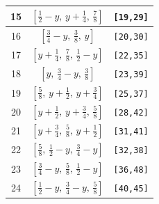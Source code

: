 \documentclass[fleqn,8pt]{jsarticle}
\begin{document}
\begin{longtable}{ccc}
15 & $\left[ \frac{1}{2} - y,\, y + \frac{1}{4},\, \frac{7}{8} \right]$ & {\tt [19,29]} \\ \hline
16 & $\left[ \frac{3}{4} - y,\, \frac{3}{8},\, y \right]$ & {\tt [20,30]} \\ \hline
17 & $\left[ y + \frac{1}{4},\, \frac{7}{8},\, \frac{1}{2} - y \right]$ & {\tt [22,35]} \\ \hline
18 & $\left[ y,\, \frac{3}{4} - y,\, \frac{3}{8} \right]$ & {\tt [23,39]} \\ \hline
19 & $\left[ \frac{5}{8},\, y + \frac{1}{2},\, y + \frac{3}{4} \right]$ & {\tt [25,37]} \\ \hline
20 & $\left[ y + \frac{1}{2},\, y + \frac{3}{4},\, \frac{5}{8} \right]$ & {\tt [28,42]} \\ \hline
21 & $\left[ y + \frac{3}{4},\, \frac{5}{8},\, y + \frac{1}{2} \right]$ & {\tt [31,41]} \\ \hline
22 & $\left[ \frac{5}{8},\, \frac{1}{2} - y,\, \frac{3}{4} - y \right]$ & {\tt [32,38]} \\ \hline
23 & $\left[ \frac{3}{4} - y,\, \frac{5}{8},\, \frac{1}{2} - y \right]$ & {\tt [36,48]} \\ \hline
24 & $\left[ \frac{1}{2} - y,\, \frac{3}{4} - y,\, \frac{5}{8} \right]$ & {\tt [40,45]} \\
\end{longtable}
\renewcommand{\arraystretch}{1.2}
\end{document}
